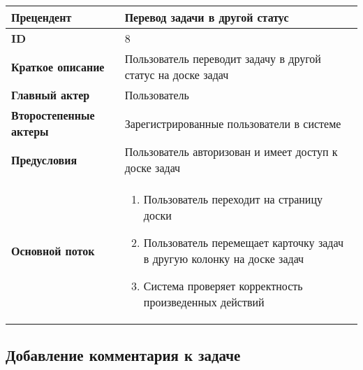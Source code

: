 \documentclass[14pt,a4paper]{extarticle}
\begin{document}
\begin{tabular}{|l|p{9cm}|}
	\hline
	\textbf{Прецендент}            & Перевод задачи в другой статус                                              \\
	\hline
	\textbf{ID}                    & 8                                                                           \\
	\hline
	\textbf{Краткое описание}      & Пользователь переводит задачу в другой статус на доске задач                \\
	\hline
	\textbf{Главный актер}         & Пользователь                                                                \\
	\hline
	\textbf{Второстепенные актеры} & Зарегистрированные пользователи в системе                                   \\
	\hline
	\textbf{Предусловия}           & Пользователь авторизован и имеет доступ к доске задач                       \\
	\hline
	\textbf{Основной поток}        & \begin{enumerate}
		                                 \item Пользователь переходит на страницу доски
		                                 \item Пользователь перемещает карточку задач в другую колонку на доске задач
		                                 \item Система проверяет корректность произведенных действий
	                                 \end{enumerate} \\
	\hline
\end{tabular}

\subsection{Добавление комментария к задаче}
\end{document}
